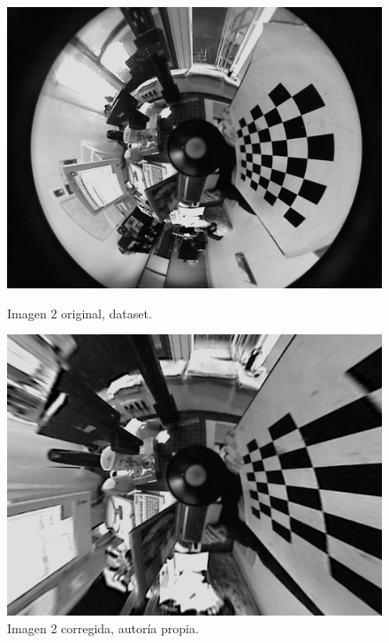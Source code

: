 \documentclass[a4paper,12pt]{article}
\begin{document}
{\begin{figure}[h!]
    \begin{minipage}[b]{0.45\textwidth}
        \centering
        \includegraphics[width=\textwidth]{fonts/VMRImage1.jpg}
        \caption{Imagen 2 original, dataset.}
        \label{fig:izquierda2}
    \end{minipage}
    \hfill
    \begin{minipage}[b]{0.45\textwidth}
        \centering
        \includegraphics[width=\textwidth]{fonts/fisheye_1.jpg}
        \caption{Imagen 2 corregida, autoría propia.}
        \label{fig:derecha2}
    \end{minipage}
\end{figure} 

\newpage

}
\end{document}
